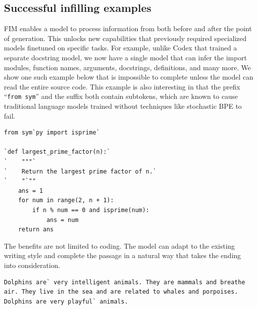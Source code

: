 \documentclass[postscript]{article}
\begin{document}
\subsection{Successful infilling examples}
\label{sec:qual:good}

FIM enables a model to process information from both before and after the point of generation. This unlocks new capabilities that previously required specialized models finetuned on specific tasks. For example, unlike Codex \citep{codex} that trained a separate docstring model, we now have a single model that can infer the import modules, function names, arguments, docstrings, definitions, and many more. We show one such example below that is impossible to complete unless the model can read the entire source code. This example is also interesting in that the prefix ``\texttt{from sym}'' and the suffix both contain subtokens, which are known to cause traditional language models trained without techniques like stochastic BPE \citep{bpe-dropout} to fail.

\vspace{-6pt}
\begin{center}
\begin{minipage}{5in}
\begin{lstlisting}[style=python]
from sym`py import isprime`

`def largest_prime_factor(n):`
`    """`
`    Return the largest prime factor of n.`
`    "`""
    ans = 1
    for num in range(2, n + 1):
        if n % num == 0 and isprime(num):
            ans = num
    return ans
\end{lstlisting}
\end{minipage}
\end{center}

The benefits are not limited to coding. The model can adapt to the existing writing style and complete the passage in a natural way that takes the ending into consideration.

\vspace{-6pt}
\begin{center}
\begin{minipage}{5in}
\begin{lstlisting}[style=text]
Dolphins are` very intelligent animals. They are mammals and breathe air. They live in the sea and are related to whales and porpoises. Dolphins are very playful` animals.
\end{lstlisting}
\end{minipage}
\end{center}
\end{document}
